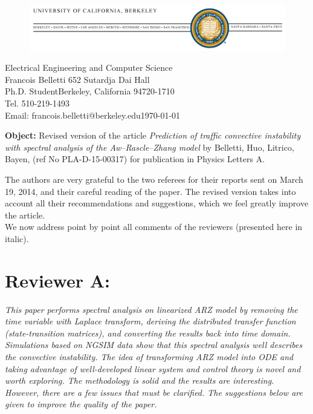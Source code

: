\documentclass{article}
\begin{document}
\begin{figure}
\includegraphics[width=1\columnwidth]{berkeley-letterhead.jpg}
\end{figure}

\hfill{}Electrical Engineering and Computer Science \\
Francois Belletti \hfill{}652 Sutardja Dai Hall \\
Ph.D. Student\hfill{}\hfill{}Berkeley, California 94720-1710\\
Tel. 510-219-1493 \\
Email: francois.belletti@berkeley.edu\hfill{}\today

\bigskip{}

\bigskip{}

\textbf{Object:} Revised version of the article \textit{Prediction of traffic convective instability with spectral analysis of the Aw--Rascle--Zhang model}
 by Belletti, Huo, Litrico, Bayen, (ref No PLA-D-15-00317) for publication in Physics Letters A.

\bigskip{}

The authors are very grateful to the two referees for their
reports sent on March 19, 2014, and their careful reading of the
paper. The revised version takes into account all their recommendations
and suggestions, which we feel greatly improve the article.\\

We now address point by point all comments of the reviewers (presented
here in italic).

\bigskip{}


\section{Reviewer A:}

\emph{
This paper performs spectral analysis on linearized ARZ model by removing the time variable with Laplace transform, deriving the distributed transfer function (state-transition matrices), and converting the results back into time domain. Simulations based on NGSIM data show that this spectral analysis well describes the convective instability. The idea of transforming ARZ model into ODE and taking advantage of well-developed linear system and control theory is novel and worth exploring. The methodology is solid and the results are interesting. However, there are a few issues that must be clarified. The suggestions below are given to improve the quality of the paper.
}
\end{document}
